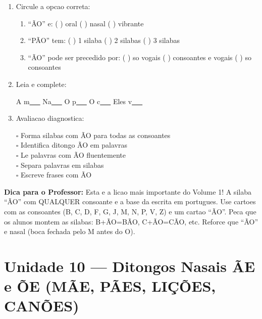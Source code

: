 \begin{exercicio}
\begin{enumerate}[resume]
  \item Circule a opcao correta:
  \begin{enumerate}[label=(\alph*)]
    \item ``ÃO'' e: ( ) oral ( ) nasal ( ) vibrante
    \item ``PÃO'' tem: ( ) 1 silaba ( ) 2 silabas ( ) 3 silabas
    \item ``ÃO'' pode ser precedido por: ( ) so vogais ( ) consoantes e vogais ( ) so consoantes
  \end{enumerate}

  \item Leia e complete:
  \begin{center}
  A m\underline{~~~} \quad Na\underline{~~~} \quad O p\underline{~~~} \quad O c\underline{~~~} \quad Eles v\underline{~~~}
  \end{center}

  \item Avaliacao diagnostica:
  \begin{center}
  $\square$ Forma silabas com ÃO para todas as consoantes\\
  $\square$ Identifica ditongo ÃO em palavras\\
  $\square$ Le palavras com ÃO fluentemente\\
  $\square$ Separa palavras em silabas\\
  $\square$ Escreve frases com ÃO
  \end{center}
\end{enumerate}
\end{exercicio}

\begin{dica}
\textbf{Dica para o Professor:} Esta e a licao mais importante do Volume 1! A silaba ``ÃO'' com QUALQUER consoante e a base da escrita em portugues. Use cartoes com as consoantes (B, C, D, F, G, J, M, N, P, V, Z) e um cartao ``ÃO''. Peca que os alunos montem as silabas: B+ÃO=BÃO, C+ÃO=CÃO, etc. Reforce que ``ÃO'' e nasal (boca fechada pelo M antes do O).
\end{dica}


\chapter{Unidade 10 --- Ditongos Nasais ÃE e ÕE (MÃE, PÃES, LIÇÕES, CANÕES)}

